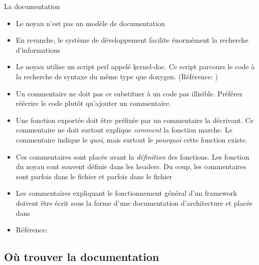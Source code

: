 \begin{frame}[fragile=singleslide]{La documentation}
  \begin{itemize}
  \item Le noyau n'est pas un modèle de documentation
  \item En  revanche, le système de  développement facilite énormément
    la recherche d'informations
  \item  Le noyau utilise  un script  perl appelé  \c{kernel-doc}. Ce
    script parcours le code à la recherche de syntaxe du même type que
    doxygen.  (Référence: )
  \item  Un  commentaire ne  doit  pas ce  substituer  à  un code  pas
    illisible.  Préférez   réécrire  le  code   plutôt  qu'ajouter  un
    commentaire.
  \item Une fonction exportée doit être préfixée par un commentaire la
    décrivant.  Ce commentaire ne doit surtout explique \emph{comment}
    la fonction  marche.  Le commentaire indique  le \emph{quoi}, mais
    surtout le \emph{pourquoi} cette fonction existe.
  \item Ces  commentaires sont  placée avant la  \emph{définition} des
    fonctions.  Les  fonction du noyau  sont souvent définie  dans les
    headers.  Du  coup, les commentaires sont parfois  dans le fichier
     et parfois dans le fichier 
  \item  Les commentaires  expliquant le  fonctionnement  général d'un
    framework  doivent être  écrit sous  la forme  d'une documentation
    d'architecture et placée dans 
  \item Référence: 
  \end{itemize}
\end{frame} 

\subsection{Où trouver la documentation}

